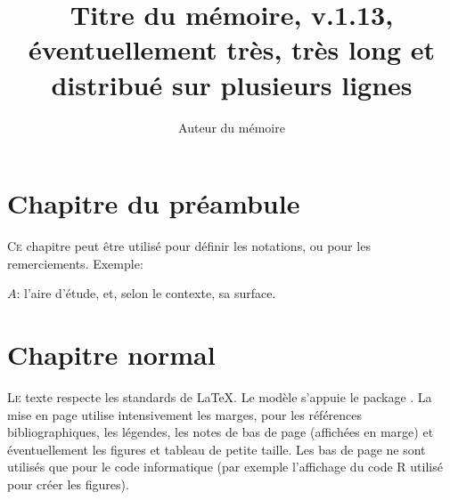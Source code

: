 \documentclass[
  a4paper, %
  11pt, extrafontsizes, %
  onecolumn, %
  openright, %
]{memoir}
\title{Titre du mémoire, v.1.13, éventuellement très, très long et distribué sur plusieurs lignes}
\author{Auteur du mémoire}
\begin{document}



\frontmatter

\makeflyleaf


\SmallMargins

\tableofcontents*
\clearpage

\LargeMargins

\chapter{Chapitre du préambule}

\lettrine{C}{e} chapitre peut être utilisé pour définir les notations, ou pour les remerciements. Exemple:

\noindent $A$: l'aire d'étude, et, selon le contexte, sa surface.



\mainmatter
\LargeMargins                   %



\chapter{Chapitre normal}

\lettrine{L}{e} texte respecte les standards de \LaTeX. 
Le modèle s'appuie le package . 
La mise en page utilise intensivement les marges, pour les références bibliographiques, les légendes, les notes de bas de page (affichées en marge) et éventuellement les figures et tableau de petite taille. 
Les bas de page ne sont utilisés que pour le code informatique (par exemple l'affichage du code R utilisé pour créer les figures).
\end{document}
